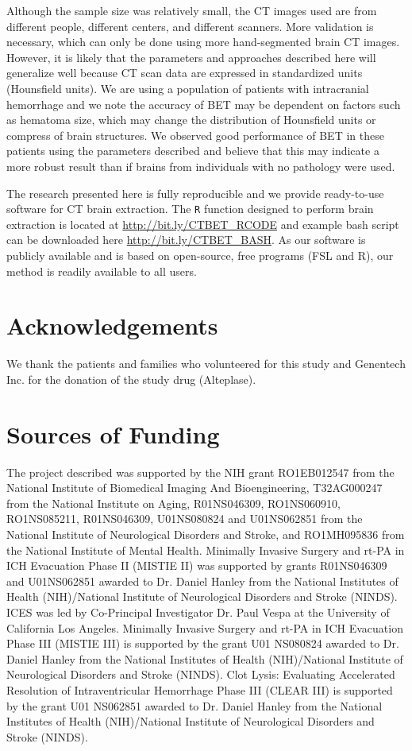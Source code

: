 \documentclass{elsarticle}\usepackage[]{graphicx}\usepackage[]{color}
\begin{document}
Although the sample size was relatively small, the CT images used are from different people, different centers, and different scanners.  More validation is necessary, which can only be done using more hand-segmented brain CT images. However, it is likely that the parameters and approaches described here will generalize well because CT scan data are expressed in standardized units (Hounsfield units).  We are using a population of patients with intracranial hemorrhage and we note the accuracy of BET may be dependent on factors such as hematoma size, which may change the distribution of Hounsfield units or compress of brain structures.  We observed good performance of BET in these patients using the parameters described and believe that this may indicate a more robust result than if brains from individuals with no pathology were used.

The research presented here is fully reproducible and we provide ready-to-use software for CT brain extraction. The \texttt{R} function designed to perform brain extraction is located at
\url{http://bit.ly/CTBET_RCODE} and example bash script can be downloaded here \url{http://bit.ly/CTBET_BASH}.  As our software is publicly available and is based on open-source, free programs (FSL and R), our method is readily available to all users.

\section*{Acknowledgements}
We thank the patients and families who volunteered for this study and Genentech Inc. for the donation of the study drug (Alteplase).

\section*{Sources of Funding}
The project described was supported by the NIH grant RO1EB012547 from the National Institute of Biomedical Imaging And Bioengineering, T32AG000247 from the National Institute on Aging, R01NS046309, RO1NS060910, RO1NS085211, R01NS046309, U01NS080824 and U01NS062851 from the National Institute of Neurological Disorders and Stroke, and RO1MH095836 from the National Institute of Mental Health. Minimally Invasive Surgery and rt-PA in ICH Evacuation Phase II (MISTIE II) was supported by grants R01NS046309 and U01NS062851 awarded to Dr. Daniel Hanley from the National Institutes of Health (NIH)/National Institute of Neurological Disorders and Stroke (NINDS).  ICES was led by Co-Principal Investigator Dr. Paul Vespa at the University of California Los Angeles. Minimally Invasive Surgery and rt-PA in ICH Evacuation Phase III (MISTIE III) is supported by the grant U01 NS080824 awarded to Dr. Daniel Hanley from the National Institutes of Health (NIH)/National Institute of Neurological Disorders and Stroke (NINDS). Clot Lysis: Evaluating Accelerated Resolution of Intraventricular Hemorrhage Phase III (CLEAR III) is supported by the grant U01 NS062851 awarded to Dr. Daniel Hanley from the National Institutes of Health (NIH)/National Institute of Neurological Disorders and Stroke (NINDS). 
\end{document}
